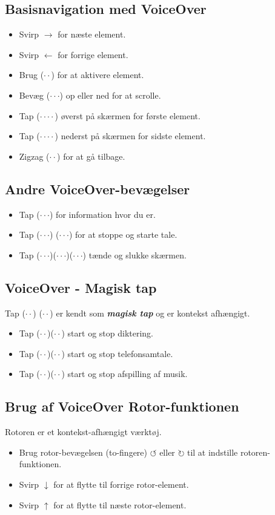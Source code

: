 \documentclass[a4paper, landscape, 10pt]{scrartcl}
\begin{document}
\begin{multicols}{2}
\subsection*{Basisnavigation med VoiceOver}
\begin{itemize}
  \item{Svirp $\rightarrow$ for næste element.}
  \item{Svirp $\leftarrow$ for forrige element.}
  \item{Brug ($\cdot\cdot$) for at aktivere element.}
  \item{Bevæg ($\cdot\cdot\cdot$) op eller ned for at scrolle.}
  \item{Tap ($\cdot\cdot\cdot\cdot$) øverst på skærmen for første element.}
  \item{Tap ($\cdot\cdot\cdot\cdot$) nederst på skærmen for sidste element.}
  \item{Zigzag ($\cdot\cdot$) for at gå tilbage.}
\end{itemize}

\subsection*{Andre VoiceOver-bevægelser}
\begin{itemize}
  \item{Tap ($\cdot\cdot\cdot$) for information hvor du er.}
  \item{Tap ($\cdot\cdot\cdot$) ($\cdot\cdot\cdot$) for at stoppe og starte tale.}
  \item{Tap ($\cdot\cdot\cdot$)($\cdot\cdot\cdot$)($\cdot\cdot\cdot$) tænde og slukke skærmen.}
\end{itemize}

\subsection*{VoiceOver - Magisk tap}
Tap ($\cdot\cdot$) ($\cdot\cdot$) er kendt som  \textbf{\textit{magisk tap}} og er kontekst afhængigt.
\begin{itemize}
  \item{Tap ($\cdot\cdot$)($\cdot\cdot$) start og stop diktering.}
  \item{Tap ($\cdot\cdot$)($\cdot\cdot$) start og stop telefonsamtale.}
  \item{Tap ($\cdot\cdot$)($\cdot\cdot$) start og stop afspilling af musik.}
\end{itemize}

\subsection*{Brug af VoiceOver Rotor-funktionen}
Rotoren er et kontekst-afhængigt værktøj. 
\begin{itemize}
  \item{Brug rotor-bevægelsen (to-fingere) $\circlearrowleft{}$ eller $\circlearrowright$ til at indstille rotoren-funktionen.}
  \item{Svirp $\downarrow$ for at flytte til forrige rotor-element.}
  \item{Svirp $\uparrow$ for at flytte til næste rotor-element.}
\end{itemize}


\end{multicols}
\end{document}
